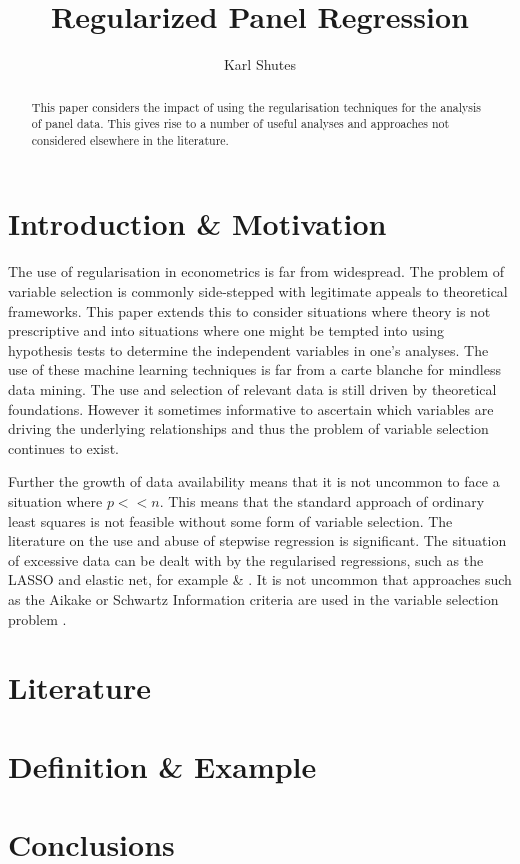 \documentclass[11pt]{amsart}
\title{Regularized Panel Regression}
\author{Karl Shutes}
\begin{document}
\maketitle
\begin{abstract}
{This paper considers the impact of using the regularisation techniques for the analysis of panel data. This gives rise to a number of useful analyses and approaches not considered elsewhere in the literature.}
\end{abstract}

\section{Introduction \& Motivation}
The use of regularisation in econometrics is far from widespread. The problem of variable selection is commonly side-stepped with legitimate appeals to theoretical frameworks. This paper extends this to consider situations where theory is not prescriptive and into situations where one might be tempted into using hypothesis tests to determine the independent variables in one's analyses. The use of these machine learning techniques is far from a carte blanche for mindless data mining. The use and selection of relevant data is still driven by theoretical foundations. However it sometimes informative to ascertain which variables are driving the underlying relationships and thus the problem  of variable selection continues to exist. 

Further the growth of data availability means that it is not uncommon to face a situation where $p<<n$. This means that the standard approach of ordinary least squares is not feasible without some form of variable selection. The literature on the use and abuse of stepwise regression is significant. The situation of excessive data can be dealt with by the regularised regressions, such as the LASSO and elastic net, for example  \cite{Hastie} \& \cite{zouphd}. It is not uncommon that approaches such as the Aikake or Schwartz Information criteria are used in the variable selection problem \cite{aid}. 



\section{Literature}

\section{Definition \& Example}

\section{Conclusions}




\end{document}
